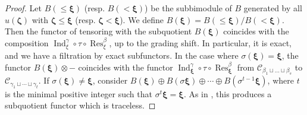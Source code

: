 \documentclass[12pt]{amsart}
\renewcommand\b{\beta}
\newcommand\g{\gamma}
\newcommand\z{\zeta}
\newcommand\s{\sigma}
\renewcommand{\1}{\mathbb 1}
\newcommand\Bxi{\boldsymbol\xi}
\newcommand\Bz{\boldsymbol\z}
\newcommand\SC{\mathscr{C}}
\newcommand\Ind{\operatorname{Ind}}
\newcommand\Res{\operatorname{Res}}
\numberwithin{equation}{section}
\begin{document}
\begin{proof}
Let $B(\le \Bxi)$ (resp. $B(< \Bxi)$)  be the subbimodule of $B$
generated by all $u(\Bz)$ with $\Bz \le \Bxi$
(resp. $\Bz < \Bxi$). 
We define $B(\Bxi) = B(\le \Bxi)/B(< \Bxi)$. 
Then the functor of tensoring with the subquotient $B(\Bxi)$ coincides with
the composition $\Ind_{\xi}^{\g}\circ \tau \circ \Res_{\xi}^{\b}$, up to the grading
shift.  In particular, it is exact, and we have a filtration by exact subfunctors. 
In the case where $\s(\Bxi) = \Bxi$, the functor $B(\Bxi)\otimes -$ coincides with
the functor $\Ind_{\Bxi}^{\g}\circ \tau\circ \Res_{\Bxi}^{\b}$ from
$\SC_{\b_1\sqcup \dots \sqcup \b_s}$ to $\SC_{\g_1\sqcup\cdots \sqcup \g_t}$.
If $\s(\Bxi) \ne \Bxi$, consider $B(\Bxi) \oplus B(\s\Bxi) \oplus \cdots \oplus B(\s^{t-1}\Bxi)$,
where $t$ is the minimal positive integer such that $\s^t\Bxi = \Bxi$. 
As in \cite{M}, this produces a subquotient functor which is traceless. 
\end{proof}
\end{document}
